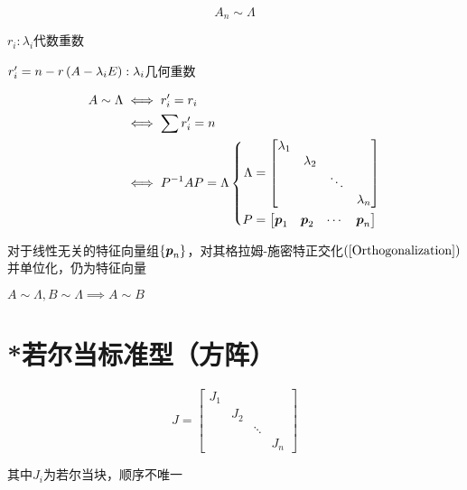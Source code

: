\documentclass{article}
\begin{document}
\begin{definition}
    \[A_n\sim\Lambda\]
\end{definition}

$r_i:\lambda_i$代数重数

$r^\prime_i=n-r\left(A-\lambda_iE\right):\lambda_i$几何重数

\[\begin{aligned}
        A\sim\Lambda & \iff r^\prime_i=r_i   \\
                     & \iff\sum r^\prime_i=n \\
                     & \iff P^{-1}AP=\Lambda
        \left\{\begin{aligned}
                   \Lambda & =
                   \begin{bmatrix}
                \lambda_1 &           &        &           \\
                          & \lambda_2 &        &           \\
                          &           & \ddots &           \\
                          &           &        & \lambda_n
            \end{bmatrix}                      \\
                   P       & =\begin{bmatrix}\boldsymbol p_1&\boldsymbol p_2&\cdots&\boldsymbol p_n\end{bmatrix}
               \end{aligned}\right.
    \end{aligned}\]

对于线性无关的特征向量组$\left\{\boldsymbol p_n\right\}$，对其格拉姆-施密特正交化$\left(\ref{Orthogonalization}\right)$并单位化，仍为特征向量

$A\sim\Lambda,B\sim\Lambda\implies A\sim B$

\section{*若尔当标准型（方阵）}

\begin{definition}
    \[J=\begin{bmatrix}
            J_1 &     &              \\
                & J_2 &              \\
                &     & \ddots &     \\
                &     &        & J_n
        \end{bmatrix}\]

    其中$J_i$为若尔当块，顺序不唯一
\end{definition}
\end{document}
